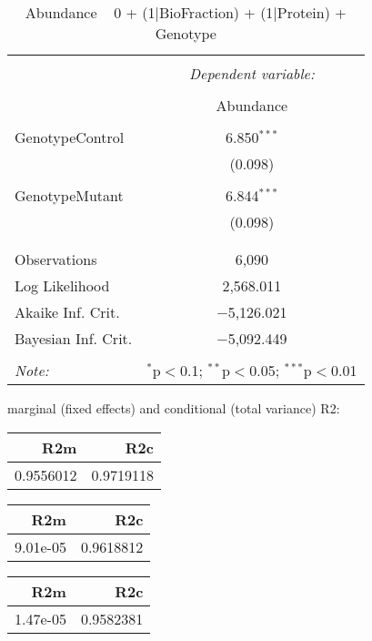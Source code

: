\documentclass[11pt]{report}
\begin{document}
\begin{table}[!htbp] \centering 
  \caption{Abundance ~ 0 + (1|BioFraction) + (1|Protein) + Genotype} 
  \label{} 
\begin{tabular}{@{\extracolsep{5pt}}lc} 
\\[-1.8ex]\hline 
\hline \\[-1.8ex] 
 & \multicolumn{1}{c}{\textit{Dependent variable:}} \\ 
\cline{2-2} 
\\[-1.8ex] & Abundance \\ 
\hline \\[-1.8ex] 
 GenotypeControl & 6.850$^{***}$ \\ 
  & (0.098) \\ 
  & \\ 
 GenotypeMutant & 6.844$^{***}$ \\ 
  & (0.098) \\ 
  & \\ 
\hline \\[-1.8ex] 
Observations & 6,090 \\ 
Log Likelihood & 2,568.011 \\ 
Akaike Inf. Crit. & $-$5,126.021 \\ 
Bayesian Inf. Crit. & $-$5,092.449 \\ 
\hline 
\hline \\[-1.8ex] 
\textit{Note:}  & \multicolumn{1}{r}{$^{*}$p$<$0.1; $^{**}$p$<$0.05; $^{***}$p$<$0.01} \\ 
\end{tabular} 
\end{table} 
marginal (fixed effects) and conditional (total variance) R2:

\begin{tabular}{r|r}
\hline
R2m & R2c\\
\hline
0.9556012 & 0.9719118\\
\hline
\end{tabular}

\begin{tabular}{r|r}
\hline
R2m & R2c\\
\hline
9.01e-05 & 0.9618812\\
\hline
\end{tabular}

\begin{tabular}{r|r}
\hline
R2m & R2c\\
\hline
1.47e-05 & 0.9582381\\
\hline
\end{tabular}
\end{document}
